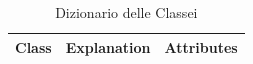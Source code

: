 \begin{longtable}{l|l|l} 
\caption{Dizionario delle Classei}
\\
Class    & Explanation                                                                                                                                                & Attributes                                                                                                                                                                                                                                                                                                                                                                                                                                                                                                                                                                                                                                                                                                                                                                                                                                                                                                                                                                                                                                                                                                                                                                                                                                                                                                                     \\ 
\hline

\end{longtable}
